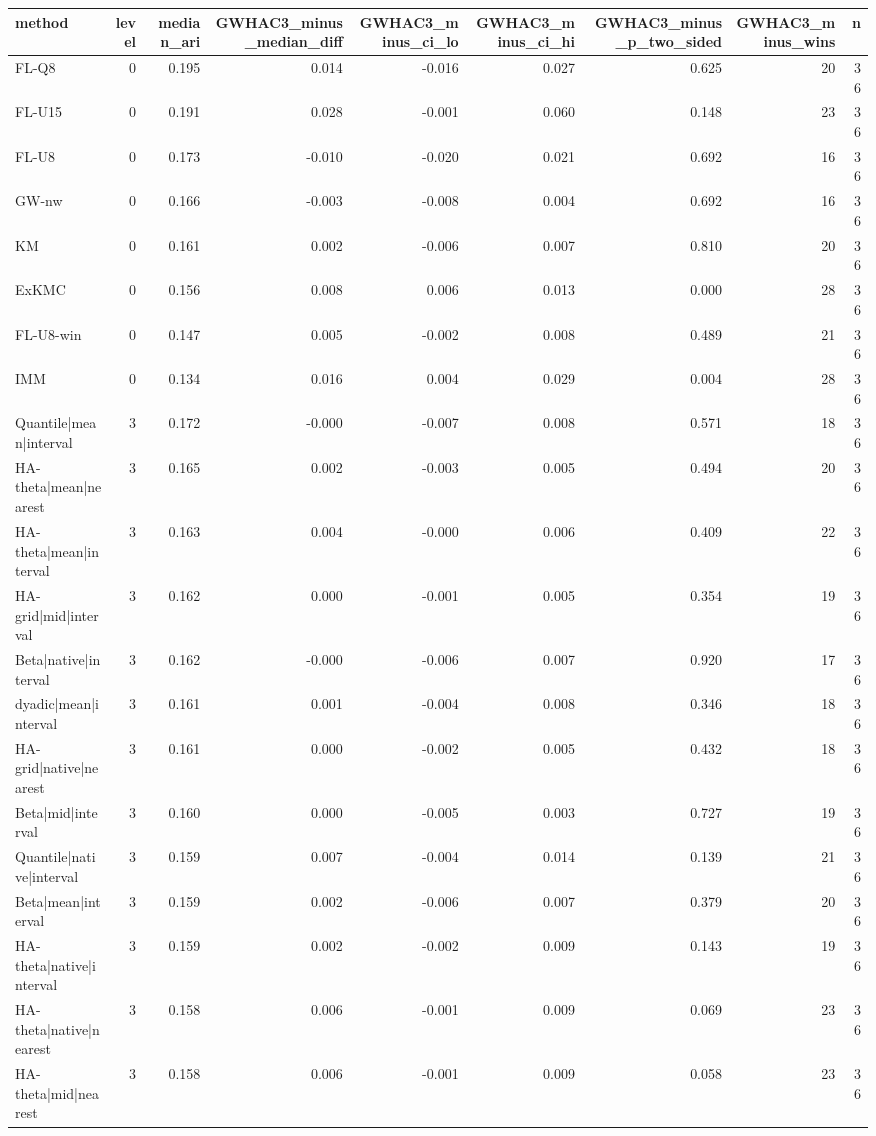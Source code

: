 \begin{tabular}{lrrrrrrrr}
\toprule
method & level & median_ari & GWHAC3_minus_median_diff & GWHAC3_minus_ci_lo & GWHAC3_minus_ci_hi & GWHAC3_minus_p_two_sided & GWHAC3_minus_wins & n \\
\midrule
FL-Q8 & 0 & 0.195 & 0.014 & -0.016 & 0.027 & 0.625 & 20 & 36 \\
FL-U15 & 0 & 0.191 & 0.028 & -0.001 & 0.060 & 0.148 & 23 & 36 \\
FL-U8 & 0 & 0.173 & -0.010 & -0.020 & 0.021 & 0.692 & 16 & 36 \\
GW-nw & 0 & 0.166 & -0.003 & -0.008 & 0.004 & 0.692 & 16 & 36 \\
KM & 0 & 0.161 & 0.002 & -0.006 & 0.007 & 0.810 & 20 & 36 \\
ExKMC & 0 & 0.156 & 0.008 & 0.006 & 0.013 & 0.000 & 28 & 36 \\
FL-U8-win & 0 & 0.147 & 0.005 & -0.002 & 0.008 & 0.489 & 21 & 36 \\
IMM & 0 & 0.134 & 0.016 & 0.004 & 0.029 & 0.004 & 28 & 36 \\
Quantile|mean|interval & 3 & 0.172 & -0.000 & -0.007 & 0.008 & 0.571 & 18 & 36 \\
HA-theta|mean|nearest & 3 & 0.165 & 0.002 & -0.003 & 0.005 & 0.494 & 20 & 36 \\
HA-theta|mean|interval & 3 & 0.163 & 0.004 & -0.000 & 0.006 & 0.409 & 22 & 36 \\
HA-grid|mid|interval & 3 & 0.162 & 0.000 & -0.001 & 0.005 & 0.354 & 19 & 36 \\
Beta|native|interval & 3 & 0.162 & -0.000 & -0.006 & 0.007 & 0.920 & 17 & 36 \\
dyadic|mean|interval & 3 & 0.161 & 0.001 & -0.004 & 0.008 & 0.346 & 18 & 36 \\
HA-grid|native|nearest & 3 & 0.161 & 0.000 & -0.002 & 0.005 & 0.432 & 18 & 36 \\
Beta|mid|interval & 3 & 0.160 & 0.000 & -0.005 & 0.003 & 0.727 & 19 & 36 \\
Quantile|native|interval & 3 & 0.159 & 0.007 & -0.004 & 0.014 & 0.139 & 21 & 36 \\
Beta|mean|interval & 3 & 0.159 & 0.002 & -0.006 & 0.007 & 0.379 & 20 & 36 \\
HA-theta|native|interval & 3 & 0.159 & 0.002 & -0.002 & 0.009 & 0.143 & 19 & 36 \\
HA-theta|native|nearest & 3 & 0.158 & 0.006 & -0.001 & 0.009 & 0.069 & 23 & 36 \\
HA-theta|mid|nearest & 3 & 0.158 & 0.006 & -0.001 & 0.009 & 0.058 & 23 & 36 \\

\end{tabular}
